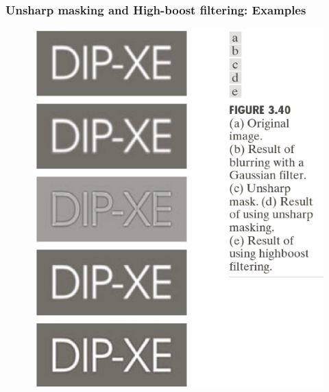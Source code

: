 \documentclass[english,11pt,table,handout]{beamer}
\begin{document}
{
	\frametitle{Unsharp masking and High-boost filtering: Examples}
	\begin{figure}[!h]
		\includegraphics[scale=0.75]{highboost.png}
	\end{figure}	
}

\end{document}
